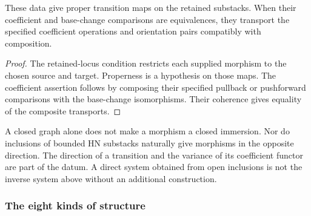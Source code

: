 \begin{proposition}
\label{prop:finite-moduli-transition-geometry-criterion}
These data give proper transition maps on the retained substacks.
When their coefficient and base-change comparisons are equivalences,
they transport the specified coefficient operations and orientation
pairs compatibly with composition.
\end{proposition}
\begin{proof}
The retained-locus condition restricts each supplied morphism to the
chosen source and target. Properness is a hypothesis on those maps.
The coefficient assertion follows by composing their specified
pullback or pushforward comparisons with the base-change
isomorphisms. Their coherence gives equality of the composite
transports.
\end{proof}

A closed graph alone does not make a morphism a closed immersion.
Nor do inclusions of bounded HN substacks naturally give morphisms
in the opposite direction. The direction of a transition and the
variance of its coefficient functor are part of the datum. A direct
system obtained from open inclusions is not the inverse system above
without an additional construction.

\subsubsection*{The eight kinds of structure}

